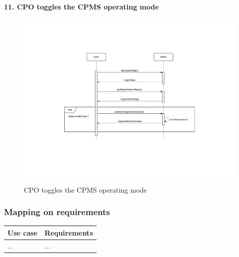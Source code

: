 \documentclass[11pt]{article}
\begin{document}
\begin{description}
    \item \textbf{11. CPO toggles the CPMS operating mode}
    \begin{figure}[!ht]
        \centering
        \includegraphics[page={11}, trim=5cm 9cm 5.7cm 3.5cm, width=0.8\linewidth, clip]{SequenceDiagrams.pdf}
        \caption{CPO toggles the CPMS operating mode}
    \end{figure}
\end{description}

\subsubsection{Mapping on requirements}

\begin{table}[H]
    \centering
    \setlength{\tabcolsep}{18pt}
    \renewcommand{\arraystretch}{1.2}
    \begin{tabularx}{\textwidth}{|>{\hsize=1.2\hsize}X|>{\hsize=0.8\hsize}X|}
        \hline
        \textbf{Use case} & \textbf{Requirements} \\
        \hline
        ... & ... \\
        \hline
    \end{tabularx}
    \label{tab:useCasesMapping}
\end{table}
\end{document}

